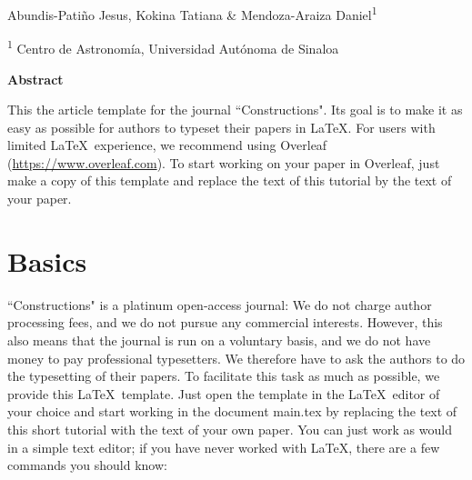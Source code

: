 \vspace{30pt}
\begin{center}
    \LARGE{}
\end{center}

\begin{center}
\vspace{4pt}
\large
    Abundis-Patiño Jesus, Kokina Tatiana \& Mendoza-Araiza Daniel\textsuperscript{1}
    
\small
   \textsuperscript{1} Centro de Astronomía, Universidad Autónoma de Sinaloa

\end{center}



\begin{small}
\begin{center}
\vspace{9pt}
\textbf{Abstract}    
\end{center}

\begin{adjustwidth}{20pt}{20pt}
\small \noindent This the article template for the journal ``Constructions". Its goal is to make it as easy as possible for authors to typeset their papers in \LaTeX. For users with limited \LaTeX \  experience, we recommend using Overleaf (\url{https://www.overleaf.com}). To start working on your paper in Overleaf, just make a copy of this template and replace the text of this tutorial by the text of your paper.
\end{adjustwidth}


\end{small}




\vspace{10pt}
\section{Basics}\label{Sec:Introduction}
``Constructions" is a platinum open-access journal: We do not charge author processing fees, and we do not pursue any commercial interests. However, this also means that the journal is run on a voluntary basis, and we do not have money to pay professional typesetters. We therefore have to ask the authors to do the typesetting of their papers. To facilitate this task as much as possible, we provide this \LaTeX \ template. Just open the template in the \LaTeX \  editor of your choice and start working in the document main.tex by replacing the text of this short tutorial with the text of your own paper. You can just work as would in a simple text editor; if you have never worked with \LaTeX, there are a few commands you should know:

